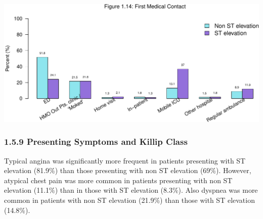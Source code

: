 \documentclass[
]{article}
\begin{document}
\includegraphics{ACSIS_2024_v1_pdf_files/figure-latex/unnamed-chunk-48-1.pdf}

\pagebreak

\subsubsection{1.5.9 Presenting Symptoms and Killip
Class}\label{presenting-symptoms-and-killip-class}

Typical angina was significantly more frequent in patients presenting
with ST elevation (81.9\%) than those presenting with non ST elevation
(69\%). However, atypical chest pain was more common in patients
presenting with non ST elevation (11.1\%) than in those with ST
elevation (8.3\%). Also dyspnea was more common in patients with non ST
elevation (21.9\%) than those with ST elevation (14.8\%).

~
\end{document}
